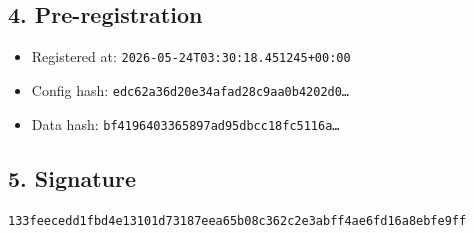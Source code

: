 \documentclass{article}
\begin{document}
\subsection*{4. Pre-registration}
\begin{itemize}
\item Registered at: \texttt{2026-05-24T03:30:18.451245+00:00}
\item Config hash: \texttt{edc62a36d20e34afad28c9aa0b4202d0\dots}
\item Data hash: \texttt{bf4196403365897ad95dbcc18fc5116a\dots}
\end{itemize}
\subsection*{5. Signature}
\texttt{133feecedd1fbd4e13101d73187eea65b08c362c2e3abff4ae6fd16a8ebfe9ff}\\
\end{document}
